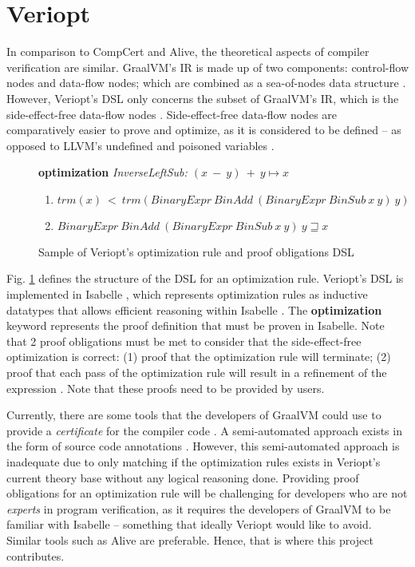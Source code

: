 \section{Veriopt}
\label{sec:Veriopt}

In comparison to CompCert and Alive, the theoretical aspects of compiler verification are similar. GraalVM's IR is made up of two components: 
control-flow nodes and data-flow nodes; which are combined as a sea-of-nodes data structure \cite{ATVA21_GraalVM_IR_Semantics}. However, 
Veriopt's DSL only concerns the subset of GraalVM's IR, which is the side-effect-free data-flow nodes \cite{Term_Graph_Optimizations}.
Side-effect-free data-flow nodes are comparatively easier to prove and optimize, as it is considered to be defined -- as opposed to LLVM's undefined 
and poisoned variables \cite{Alive2}.

\begin{figure}[!htb]
    \textbf{optimization} \emph{InverseLeftSub: \((x\ -\ y)\ +\ y \longmapsto x\)}
    \begin{enumerate}
        \item \(trm(x)\ <\ trm(BinaryExpr\ BinAdd\ (BinaryExpr\ BinSub\ x\ y)\ y)\)
        \item \(BinaryExpr\ BinAdd\ (BinaryExpr\ BinSub\ x\ y)\ y \sqsupseteq x\)
    \end{enumerate}

    \caption{Sample of Veriopt's optimization rule and proof obligations DSL \cite[Fig. 3]{Term_Graph_Optimizations}}
    \label{fig:VerioptDSLSample}
\end{figure}

Fig. \ref{fig:VerioptDSLSample} defines the structure of the DSL for an optimization rule. Veriopt's DSL is implemented in Isabelle 
\cite{IsabelleHOL}, which represents optimization rules as inductive datatypes that allows efficient reasoning within Isabelle 
\cite[Sec. 3]{ATVA21_GraalVM_IR_Semantics} \cite{biendarra_ning_2024}. 
The \textbf{optimization} keyword represents the proof definition that must be proven in Isabelle. 
Note that 2 proof obligations must be met to consider that the side-effect-free optimization is correct: 
(1) proof that the optimization rule will terminate; (2) proof that each pass of the optimization rule will 
result in a refinement of the expression \cite{Term_Graph_Optimizations}. Note that these proofs need to be provided by users.

Currently, there are some tools that the developers of GraalVM could use to provide a \emph{certificate} for the compiler code 
\cite[Sec. 7]{Term_Graph_Optimizations}. A semi-automated approach exists in the form of source code annotations \cite[Sec. 5.1]{Term_Graph_Optimizations}.
However, this semi-automated approach is inadequate due to only matching if the optimization rules exists in Veriopt's current theory base without 
any logical reasoning done. Providing proof obligations for an optimization rule will be challenging for developers who are not 
\emph{experts} in program verification, as it requires the developers of GraalVM to be familiar with Isabelle -- something that ideally Veriopt 
would like to avoid. Similar tools such as Alive \cite{AliveInLean} are preferable. Hence, that is where this project contributes.